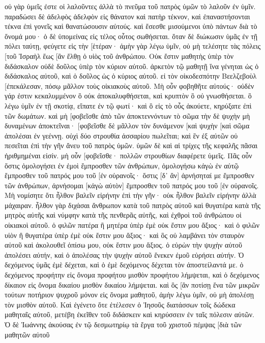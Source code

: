οὐ γὰρ ὑμεῖς ἐστε οἱ λαλοῦντες ἀλλὰ τὸ πνεῦμα τοῦ πατρὸς ὑμῶν τὸ λαλοῦν ἐν ὑμῖν. 
παραδώσει δὲ ἀδελφὸς ἀδελφὸν εἰς θάνατον καὶ πατὴρ τέκνον, καὶ ἐπαναστήσονται τέκνα ἐπὶ γονεῖς καὶ θανατώσουσιν αὐτούς. 
καὶ ἔσεσθε μισούμενοι ὑπὸ πάντων διὰ τὸ ὄνομά μου· ὁ δὲ ὑπομείνας εἰς τέλος οὗτος σωθήσεται. 
ὅταν δὲ διώκωσιν ὑμᾶς ἐν τῇ πόλει ταύτῃ, φεύγετε εἰς τὴν [ἑτέραν· ἀμὴν γὰρ λέγω ὑμῖν, οὐ μὴ τελέσητε τὰς πόλεις [τοῦ Ἰσραὴλ ἕως [ἂν ἔλθῃ ὁ υἱὸς τοῦ ἀνθρώπου. 
Οὐκ ἔστιν μαθητὴς ὑπὲρ τὸν διδάσκαλον οὐδὲ δοῦλος ὑπὲρ τὸν κύριον αὐτοῦ. 
ἀρκετὸν τῷ μαθητῇ ἵνα γένηται ὡς ὁ διδάσκαλος αὐτοῦ, καὶ ὁ δοῦλος ὡς ὁ κύριος αὐτοῦ. εἰ τὸν οἰκοδεσπότην Βεελζεβοὺλ [ἐπεκάλεσαν, πόσῳ μᾶλλον τοὺς οἰκιακοὺς αὐτοῦ. 
Μὴ οὖν φοβηθῆτε αὐτούς· οὐδὲν γάρ ἐστιν κεκαλυμμένον ὃ οὐκ ἀποκαλυφθήσεται, καὶ κρυπτὸν ὃ οὐ γνωσθήσεται. 
ὃ λέγω ὑμῖν ἐν τῇ σκοτίᾳ, εἴπατε ἐν τῷ φωτί· καὶ ὃ εἰς τὸ οὖς ἀκούετε, κηρύξατε ἐπὶ τῶν δωμάτων. 
καὶ μὴ [φοβεῖσθε ἀπὸ τῶν ἀποκτεννόντων τὸ σῶμα τὴν δὲ ψυχὴν μὴ δυναμένων ἀποκτεῖναι· [φοβεῖσθε δὲ μᾶλλον τὸν δυνάμενον [καὶ ψυχὴν [καὶ σῶμα ἀπολέσαι ἐν γεέννῃ. 
οὐχὶ δύο στρουθία ἀσσαρίου πωλεῖται; καὶ ἓν ἐξ αὐτῶν οὐ πεσεῖται ἐπὶ τὴν γῆν ἄνευ τοῦ πατρὸς ὑμῶν. 
ὑμῶν δὲ καὶ αἱ τρίχες τῆς κεφαλῆς πᾶσαι ἠριθμημέναι εἰσίν. 
μὴ οὖν [φοβεῖσθε· πολλῶν στρουθίων διαφέρετε ὑμεῖς. 
Πᾶς οὖν ὅστις ὁμολογήσει ἐν ἐμοὶ ἔμπροσθεν τῶν ἀνθρώπων, ὁμολογήσω κἀγὼ ἐν αὐτῷ ἔμπροσθεν τοῦ πατρός μου τοῦ [ἐν οὐρανοῖς· 
ὅστις [δ᾽ ἂν] ἀρνήσηταί με ἔμπροσθεν τῶν ἀνθρώπων, ἀρνήσομαι [κἀγὼ αὐτὸν] ἔμπροσθεν τοῦ πατρός μου τοῦ [ἐν οὐρανοῖς. 
Μὴ νομίσητε ὅτι ἦλθον βαλεῖν εἰρήνην ἐπὶ τὴν γῆν· οὐκ ἦλθον βαλεῖν εἰρήνην ἀλλὰ μάχαιραν. 
ἦλθον γὰρ διχάσαι ἄνθρωπον κατὰ τοῦ πατρὸς αὐτοῦ καὶ θυγατέρα κατὰ τῆς μητρὸς αὐτῆς καὶ νύμφην κατὰ τῆς πενθερᾶς αὐτῆς, 
καὶ ἐχθροὶ τοῦ ἀνθρώπου οἱ οἰκιακοὶ αὐτοῦ. 
ὁ φιλῶν πατέρα ἢ μητέρα ὑπὲρ ἐμὲ οὐκ ἔστιν μου ἄξιος· καὶ ὁ φιλῶν υἱὸν ἢ θυγατέρα ὑπὲρ ἐμὲ οὐκ ἔστιν μου ἄξιος· 
καὶ ὃς οὐ λαμβάνει τὸν σταυρὸν αὐτοῦ καὶ ἀκολουθεῖ ὀπίσω μου, οὐκ ἔστιν μου ἄξιος. 
ὁ εὑρὼν τὴν ψυχὴν αὐτοῦ ἀπολέσει αὐτήν, καὶ ὁ ἀπολέσας τὴν ψυχὴν αὐτοῦ ἕνεκεν ἐμοῦ εὑρήσει αὐτήν. 
Ὁ δεχόμενος ὑμᾶς ἐμὲ δέχεται, καὶ ὁ ἐμὲ δεχόμενος δέχεται τὸν ἀποστείλαντά με. 
ὁ δεχόμενος προφήτην εἰς ὄνομα προφήτου μισθὸν προφήτου λήμψεται, καὶ ὁ δεχόμενος δίκαιον εἰς ὄνομα δικαίου μισθὸν δικαίου λήμψεται. 
καὶ ὃς [ἂν ποτίσῃ ἕνα τῶν μικρῶν τούτων ποτήριον ψυχροῦ μόνον εἰς ὄνομα μαθητοῦ, ἀμὴν λέγω ὑμῖν, οὐ μὴ ἀπολέσῃ τὸν μισθὸν αὐτοῦ. 
Καὶ ἐγένετο ὅτε ἐτέλεσεν ὁ Ἰησοῦς διατάσσων τοῖς δώδεκα μαθηταῖς αὐτοῦ, μετέβη ἐκεῖθεν τοῦ διδάσκειν καὶ κηρύσσειν ἐν ταῖς πόλεσιν αὐτῶν. 
Ὁ δὲ Ἰωάννης ἀκούσας ἐν τῷ δεσμωτηρίῳ τὰ ἔργα τοῦ χριστοῦ πέμψας [διὰ τῶν μαθητῶν αὐτοῦ 
